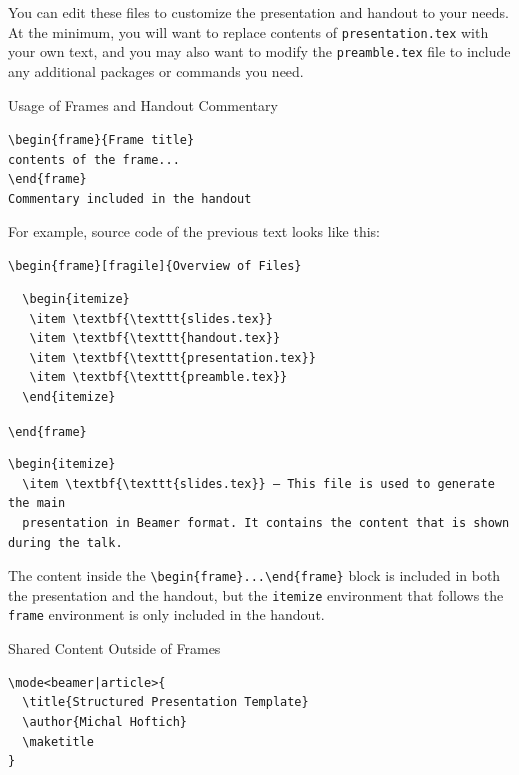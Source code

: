 You can edit these files to customize the presentation and handout to your
needs. At the minimum, you will want to replace contents of
\texttt{presentation.tex} with your own text, and you may also want to modify
the \texttt{preamble.tex} file to include any additional packages or commands
you need.


\begin{frame}[fragile]{Usage of Frames and Handout Commentary}

\begin{likeverbatim}  
  \verb|\begin{frame}{Frame title}|\\
  \verb|contents of the frame...|\\
  \verb|\end|\verb|{frame}|\\
  \vspace{1em}
  \verb|Commentary included in the handout|
\end{likeverbatim}

\end{frame}

For example, source code of the previous text looks like this:

\verb|\begin|\verb|{frame}[fragile]{Overview of Files}|
\begin{verbatim}
  \begin{itemize}
   \item \textbf{\texttt{slides.tex}} 
   \item \textbf{\texttt{handout.tex}}
   \item \textbf{\texttt{presentation.tex}}
   \item \textbf{\texttt{preamble.tex}}
  \end{itemize}
\end{verbatim}
\verb|\end|\verb|{frame}|
\begin{verbatim}
\begin{itemize}
  \item \textbf{\texttt{slides.tex}} – This file is used to generate the main 
  presentation in Beamer format. It contains the content that is shown during the talk.
\end{verbatim}

The content inside the \verb|\begin|\verb|{frame}...\end|\verb|{frame}| block is included in both
the presentation and the handout, but the \texttt{itemize} environment that follows
the \verb|frame| environment is only included in the handout.


\begin{frame}[fragile]{Shared Content Outside of Frames}

\begin{verbatim}
\mode<beamer|article>{
  \title{Structured Presentation Template}
  \author{Michal Hoftich}
  \maketitle
}
  
\end{verbatim}
\end{frame}

